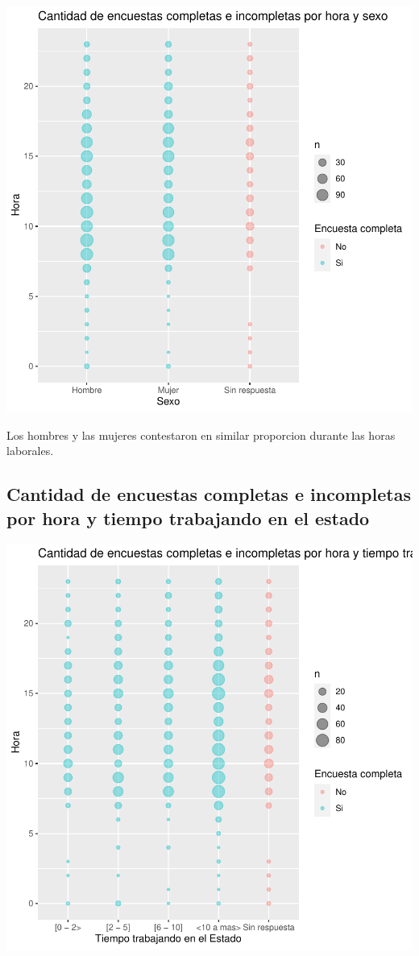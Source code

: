 \documentclass{article}
\begin{document}
\includegraphics{seguimientov3-012}

Los hombres y las mujeres contestaron en similar proporcion durante las horas laborales.

\subsection{Cantidad de encuestas completas e incompletas por hora y tiempo trabajando en el estado}

\includegraphics{seguimientov3-013}
\end{document}
